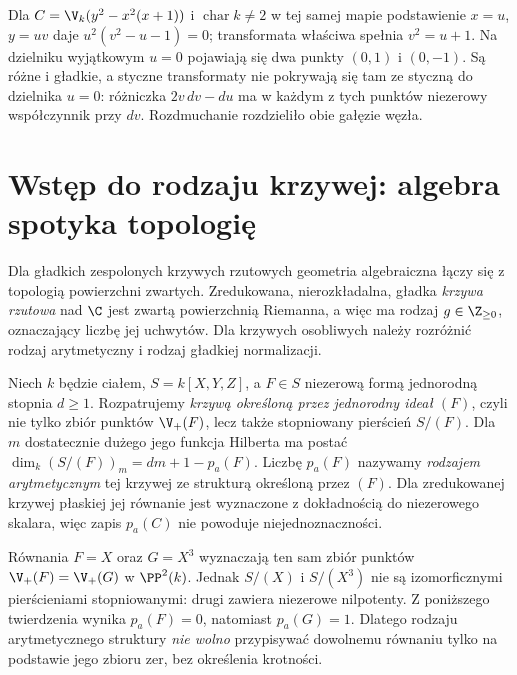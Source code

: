 \begin{przyklad}
Dla $C=\V_k(y^2-x^2(x+1))$ i $\operatorname{char}k\ne2$
w tej samej mapie podstawienie $x=u$, $y=uv$ daje
$u^2(v^2-u-1)=0$; transformata właściwa spełnia
$v^2=u+1$. Na dzielniku wyjątkowym $u=0$ pojawiają się
dwa punkty $(0,1)$ i $(0,-1)$. Są różne i gładkie,
a styczne transformaty nie pokrywają się tam ze styczną
do dzielnika $u=0$: różniczka
$2v\,dv-du$ ma w każdym z tych punktów niezerowy
współczynnik przy $dv$. Rozdmuchanie rozdzieliło
obie gałęzie węzła.
\end{przyklad}

\section{Wstęp do rodzaju krzywej: algebra spotyka topologię}

Dla gładkich zespolonych krzywych rzutowych geometria
algebraiczna łączy się z topologią powierzchni zwartych.
Zredukowana, nierozkładalna, gładka \emph{krzywa rzutowa}
nad $\C$ jest zwartą powierzchnią Riemanna, a więc ma rodzaj
$g\in\Z_{\ge0}$, oznaczający liczbę jej uchwytów.
Dla krzywych osobliwych należy rozróżnić rodzaj
arytmetyczny i rodzaj gładkiej normalizacji.

\begin{definicja}
Niech $k$ będzie ciałem, $S=k[X,Y,Z]$, a $F\in S$
niezerową formą jednorodną stopnia $d\ge1$.
Rozpatrujemy \emph{krzywą określoną przez jednorodny
ideał $(F)$}, czyli nie tylko zbiór punktów
$\V_+(F)$, lecz także stopniowany pierścień $S/(F)$.
Dla $m$ dostatecznie dużego jego funkcja Hilberta ma
postać $\dim_k(S/(F))_m=dm+1-p_a(F)$.
Liczbę $p_a(F)$ nazywamy \emph{rodzajem arytmetycznym}
tej krzywej ze strukturą określoną przez $(F)$.
Dla zredukowanej krzywej płaskiej jej równanie jest
wyznaczone z dokładnością do niezerowego skalara,
więc zapis $p_a(C)$ nie powoduje niejednoznaczności.
\end{definicja}

\begin{przyklad}
Równania $F=X$ oraz $G=X^3$ wyznaczają ten sam
zbiór punktów $\V_+(F)=\V_+(G)$ w $\PP^2(k)$.
Jednak $S/(X)$ i $S/(X^3)$ nie są izomorficznymi
pierścieniami stopniowanymi: drugi zawiera niezerowe
nilpotenty. Z poniższego twierdzenia wynika
$p_a(F)=0$, natomiast $p_a(G)=1$.
Dlatego rodzaju arytmetycznego struktury \emph{nie wolno}
przypisywać dowolnemu równaniu tylko na podstawie
jego zbioru zer, bez określenia krotności.
\end{przyklad}

